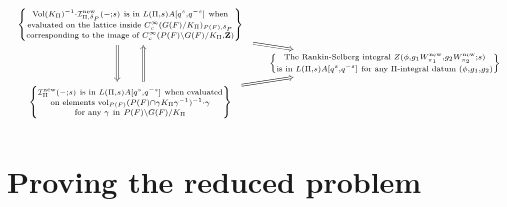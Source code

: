 \documentclass{amsart}
\theoremstyle{plain}
\theoremstyle{plain}
\theoremstyle{remark}
\begin{document}
\begin{align}\label{eq: reduction step}
    \begin{tikzcd}[ampersand replacement=\&,sep=tiny]
	\begin{array}{c} \left\{ \substack{ \mathrm{Vol}(K_\Pi)^{-1}\cdot\mathcal{I}_{\Pi,\delta_P}^\mathrm{new}(-;s)\ \text{is in } L(\Pi,s)A[q^s,q^{-s}]\ \text{when}\\ \text{evaluated on the lattice inside }C_c^\infty(G(F)/K_\Pi)_{P(F),\delta_P} \\ \text{corresponding to the image of }C_c^\infty(P(F)\backslash G(F)/K_\Pi,\mathbf{Z})} \right\}  \end{array} \\
	\& \begin{array}{c} \left\{  \substack{  \text{The Rankin-Selberg integral }Z(\phi,g_1W_{\pi_1}^\mathrm{new}, g_2W_{\pi_2}^\mathrm{new};s) \\ \text{is in }L(\Pi,s)A[q^s,q^{-s}]\ \text{for any }\Pi\text{-integral datum }(\phi,g_1,g_2)   } \right\}  \end{array} \\
	\begin{array}{c} \left\{ \substack{ \mathcal{I}_{\Pi}^\mathrm{new}(-;s)\ \text{is in } L(\Pi,s)A[q^s,q^{-s}]\ \text{when evaluated}\\ \text{on elements }\mathrm{vol}_{P(F)}(P(F)\cap\gamma K_\Pi \gamma^{-1})^{-1}\cdot \gamma \\ \text{for any }\gamma\ \text{in}\ P(F)\backslash G(F)/K_\Pi     } \right\}  \end{array}
	\arrow[Rightarrow, from=1-1, to=2-2]
	\arrow[shift right=5, Rightarrow, from=1-1, to=3-1]
	\arrow[shift right=5, Rightarrow, from=3-1, to=1-1]
	\arrow[Rightarrow, from=3-1, to=2-2]
\end{tikzcd}
\end{align}



\section{Proving the reduced problem}\label{sec 4}
\end{document}
